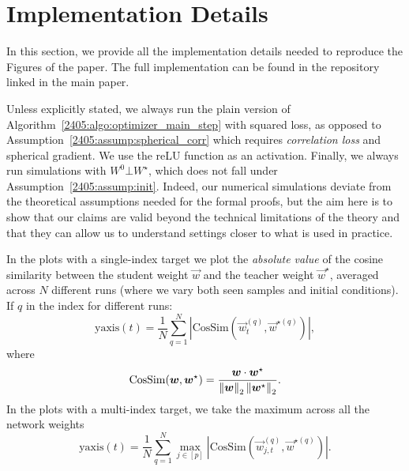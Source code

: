 \section{Implementation Details} \label{2405:sec:app:implementation}
In this section, we provide all the implementation details needed to reproduce the Figures of the paper. The full implementation can be found in the repository linked in the main paper.

Unless explicitly stated, we always run the plain version of Algorithm~\ref{2405:algo:optimizer_main_step} with squared loss, as opposed to Assumption~\ref{2405:assump:spherical_corr} which requires \emph{correlation loss} and spherical gradient. We use the reLU function as an activation. Finally, we always run simulations with \(W^0\bot W^\star\), which does not fall under Assumption~\ref{2405:assump:init}. Indeed, our numerical simulations deviate from the theoretical assumptions needed for the formal proofs, but the aim here is to show that our claims are valid beyond the technical limitations of the theory and that they can allow us to understand settings closer to what is used in practice.

In the plots with a single-index target we plot the \emph{absolute value} of the cosine similarity between the student weight \(\vec{w}\) and the teacher weight \(\vec{w}^\star\), averaged across \(N\) different runs (where we vary both seen samples and initial conditions). If \(q\) in the index for different runs:
\[\text{yaxis}(t)=\frac1N\sum_{q=1}^N\left|\mathrm{CosSim}(\vec w^{(q)}_t,\vec w^{\star{(q)}})\right|,\]
where
\[\mathrm{CosSim}({\boldsymbol{w}},{\boldsymbol{w}}^{\star}) = \frac{{\boldsymbol{w}}\cdot{\boldsymbol{w}}^\star}{\left\lVert {\boldsymbol{w}}\right\rVert_2\left\lVert {\boldsymbol{w}}^\star\right\rVert_2}.\]
In the plots with a multi-index target, we take the maximum across all the network weights
\[\text{yaxis}(t)=\frac1N\sum_{q=1}^N\max_{j\in[p]}\left|\mathrm{CosSim}(\vec w^{(q)}_{j,t},\vec w^{\star{(q)}})\right|.\]
